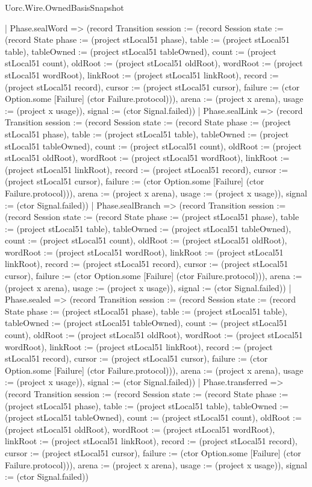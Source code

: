 \begin{lexlean}{Uorc.Wire.OwnedBasisSnapshot}
\begin{semanticmodule}
{      | Phase.sealWord => (record Transition {session := (record Session {state := (record State {phase := (project stLocal51 phase), table := (project stLocal51 table), tableOwned := (project stLocal51 tableOwned), count := (project stLocal51 count), oldRoot := (project stLocal51 oldRoot), wordRoot := (project stLocal51 wordRoot), linkRoot := (project stLocal51 linkRoot), record := (project stLocal51 record), cursor := (project stLocal51 cursor), failure := (ctor Option.some [Failure] (ctor Failure.protocol))}), arena := (project x arena), usage := (project x usage)}), signal := (ctor Signal.failed)})
      | Phase.sealLink => (record Transition {session := (record Session {state := (record State {phase := (project stLocal51 phase), table := (project stLocal51 table), tableOwned := (project stLocal51 tableOwned), count := (project stLocal51 count), oldRoot := (project stLocal51 oldRoot), wordRoot := (project stLocal51 wordRoot), linkRoot := (project stLocal51 linkRoot), record := (project stLocal51 record), cursor := (project stLocal51 cursor), failure := (ctor Option.some [Failure] (ctor Failure.protocol))}), arena := (project x arena), usage := (project x usage)}), signal := (ctor Signal.failed)})
      | Phase.sealBranch => (record Transition {session := (record Session {state := (record State {phase := (project stLocal51 phase), table := (project stLocal51 table), tableOwned := (project stLocal51 tableOwned), count := (project stLocal51 count), oldRoot := (project stLocal51 oldRoot), wordRoot := (project stLocal51 wordRoot), linkRoot := (project stLocal51 linkRoot), record := (project stLocal51 record), cursor := (project stLocal51 cursor), failure := (ctor Option.some [Failure] (ctor Failure.protocol))}), arena := (project x arena), usage := (project x usage)}), signal := (ctor Signal.failed)})
      | Phase.sealed => (record Transition {session := (record Session {state := (record State {phase := (project stLocal51 phase), table := (project stLocal51 table), tableOwned := (project stLocal51 tableOwned), count := (project stLocal51 count), oldRoot := (project stLocal51 oldRoot), wordRoot := (project stLocal51 wordRoot), linkRoot := (project stLocal51 linkRoot), record := (project stLocal51 record), cursor := (project stLocal51 cursor), failure := (ctor Option.some [Failure] (ctor Failure.protocol))}), arena := (project x arena), usage := (project x usage)}), signal := (ctor Signal.failed)})
      | Phase.transferred => (record Transition {session := (record Session {state := (record State {phase := (project stLocal51 phase), table := (project stLocal51 table), tableOwned := (project stLocal51 tableOwned), count := (project stLocal51 count), oldRoot := (project stLocal51 oldRoot), wordRoot := (project stLocal51 wordRoot), linkRoot := (project stLocal51 linkRoot), record := (project stLocal51 record), cursor := (project stLocal51 cursor), failure := (ctor Option.some [Failure] (ctor Failure.protocol))}), arena := (project x arena), usage := (project x usage)}), signal := (ctor Signal.failed)})
}
\end{semanticmodule}
\end{lexlean}
